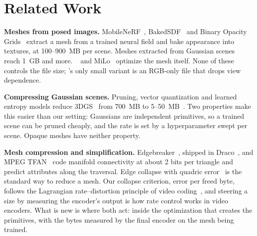 \section{Related Work}
\label{sec:related}

\noindent\textbf{Meshes from posed images.} MobileNeRF~\cite{mobilenerf2023}, BakedSDF~\cite{bakedsdf2023} and Binary Opacity Grids~\cite{bog2024} extract a mesh from a trained neural field and bake appearance into textures, at 100--900~MB per scene. Meshes extracted from Gaussian scenes~\cite{sugar2024,rade2024,gof2024} reach 1~GB and more. \MS~\cite{meshsplatting2025} and MiLo~\cite{milo2025} optimize the mesh itself. None of these controls the file size; \MS's only small variant is an RGB-only file that drops view dependence.

\noindent\textbf{Compressing Gaussian scenes.} Pruning, vector quantization and learned entropy models reduce 3DGS~\cite{kerbl2023gaussians} from 700~MB to 5--50~MB~\cite{compact3dgs2024,lightgaussian2024,hac2024,hacpp2025,compgs2024,rdogaussian2024,scaffold2024}. Two properties make this easier than our setting: Gaussians are independent primitives, so a trained scene can be pruned cheaply, and the rate is set by a hyperparameter swept per scene. Opaque meshes have neither property.

\noindent\textbf{Mesh compression and simplification.} Edgebreaker~\cite{rossignac1999edgebreaker}, shipped in Draco~\cite{draco}, and MPEG TFAN~\cite{mamou2009tfan} code manifold connectivity at about 2 bits per triangle and predict attributes along the traversal. Edge collapse with quadric error~\cite{garland1997qem,hoppe1996pm} is the standard way to reduce a mesh. Our collapse criterion, error per freed byte, follows the Lagrangian rate--distortion principle of video coding~\cite{sullivan1998rd}, and steering a size by measuring the encoder's output is how rate control works in video encoders. What is new is where both act: inside the optimization that creates the primitives, with the bytes measured by the final encoder on the mesh being trained.

